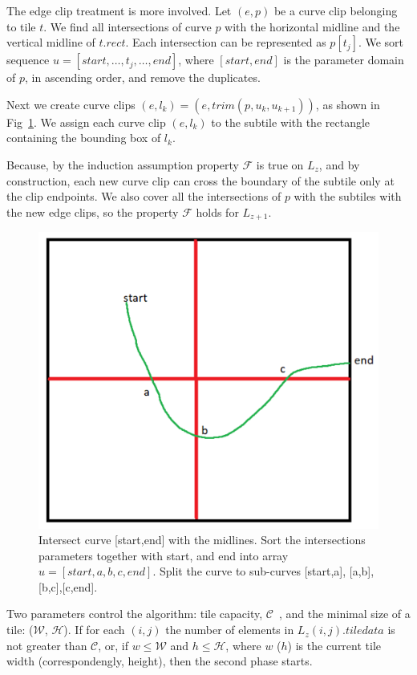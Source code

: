 \documentclass{gd-llncs}
\newcommand{\capac}{$\mathcal{C}$}
\newcommand{\mw}{$\mathcal{W}$}
\newcommand{\mh}{$\mathcal{H}$}
\begin{document}
{The edge clip treatment is more involved. Let $(e, p)$ be a curve clip belonging to tile $t$. We find all intersections of curve $p$ with the horizontal midline and the vertical midline of $t.\textit{rect}$. Each intersection can be represented as $p[t_j]$. We sort sequence $u =[start, \dots, t_j, \dots, end]$, where $[start,end]$ is the parameter domain of $p$, in ascending order, and remove the duplicates. 

Next we create curve clips $(e, l_k)=(e, \textit{trim}(p, u_k, u_{k+1}))$, as shown in Fig~\ref{fig:clip}. We assign each curve clip $(e,l_k)$ to the subtile with the rectangle containing the bounding box of $l_k$. 

Because, by the induction assumption property $\mathcal{F}$ is true on $L_z$, and by construction, each new curve clip can cross the boundary of the subtile only at the clip endpoints. We also cover all the intersections of $p$ with the subtiles with the new edge clips, so the property $\mathcal{F}$ holds for $L_{z+1}$.
\begin{figure}[!tbp]
  \centering
    \includegraphics[width=\textwidth/2]{./edge_clips.png}
    \caption{Intersect curve [start,end] with the midlines.
Sort the intersections parameters together with start, and end into array $u = [start, a,b,c, end]$. Split the curve to sub-curves [start,a], [a,b],[b,c],[c,end].}
\label{fig:clip}
  \end{figure}

Two parameters control the algorithm: tile capacity, \capac~, and the minimal size of a tile: (\mw, \mh). 
If for each $(i,j)$ the number of elements in $L_z(i,j).\textit{tiledata}$ is not greater than \capac, or, if $w \leq \mathcal{W}$ and $h \leq \mathcal{H}$, where $w$ ($h$) is the current tile width (correspondengly, height), then the second phase starts.

}
\end{document}
